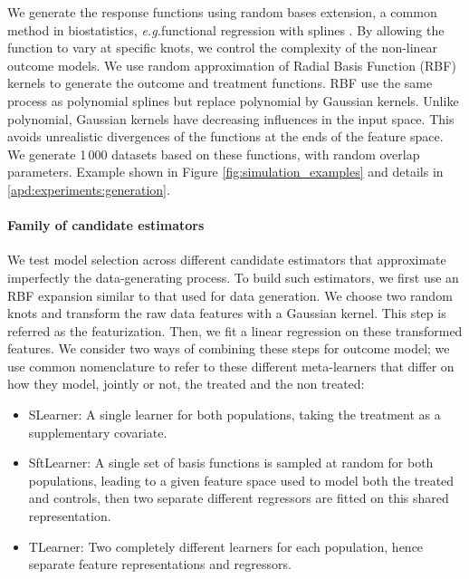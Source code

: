 \documentclass[a4paper,num-refs]{oup-contemporary}%
\newcommand{\eg}{\emph{e.g.}}
\begin{document}
We generate the response functions using random bases extension, a common method
in biostatistics, \eg functional regression with splines
\cite{howe_splines_2011, perperoglou_review_2019}. By allowing the function to
vary at specific knots, we control the complexity of the non-linear outcome
models. We use random approximation of Radial Basis Function (RBF) kernels
\cite{rahimi_random_2008} to generate the outcome and treatment functions. RBF
use the same process as polynomial splines but replace polynomial by Gaussian
kernels. Unlike polynomial, Gaussian kernels have decreasing influences in the
input space. This avoids unrealistic divergences of the functions at the
ends of the feature space. We generate 1\,000 datasets based on these functions,
with random overlap parameters. Example shown in Figure
\ref{fig:simulation_examples} and details in \ref{apd:experiments:generation}.

%

\paragraph{Family of candidate estimators}

We test model selection across different candidate estimators that
approximate imperfectly the
data-generating process. To build such estimators, we first use an RBF
expansion similar to that used for data generation. We choose two random
knots and transform the raw data features with a Gaussian
kernel. This step is referred as the featurization. Then, we fit a linear
regression on these transformed features. We consider two ways of combining
these steps for outcome model; we use common nomenclature
\cite{kunzel_metalearners_2019,shen2023rctrep} to refer to these different
meta-learners that differ on how they model, jointly or not, the treated and the
non treated:
\begin{itemize}
    \item SLearner: A single learner for both populations, taking the treatment as
          a supplementary covariate.
    \item SftLearner: A single set of basis functions is sampled at random for both
          populations, leading to a given feature space used to model both the treated and
          controls, then two
          separate different regressors are fitted on this shared representation.
    \item TLearner: Two completely different learners for each population, hence
          separate feature representations and regressors.
\end{itemize}
\end{document}
